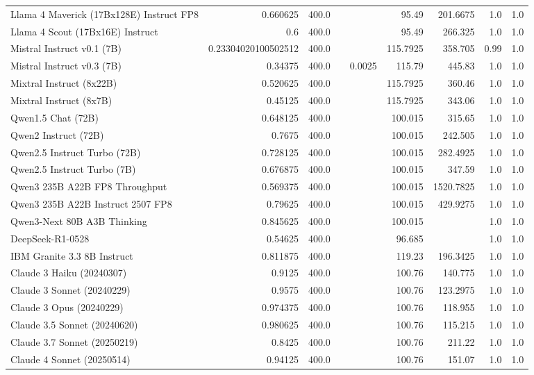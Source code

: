 \begin{table}[htp]
{\begin{tabular}{lrrrrrrrr}
Llama 4 Maverick (17Bx128E) Instruct FP8 & 0.660625 & 400.0 &  &  & 95.49 & 201.6675 & 1.0 & 1.0 \\
Llama 4 Scout (17Bx16E) Instruct & 0.6 & 400.0 &  &  & 95.49 & 266.325 & 1.0 & 1.0 \\
Mistral Instruct v0.1 (7B) & 0.23304020100502512 & 400.0 &  &  & 115.7925 & 358.705 & 0.99 & 1.0 \\
Mistral Instruct v0.3 (7B) & 0.34375 & 400.0 &  & 0.0025 & 115.79 & 445.83 & 1.0 & 1.0 \\
Mixtral Instruct (8x22B) & 0.520625 & 400.0 &  &  & 115.7925 & 360.46 & 1.0 & 1.0 \\
Mixtral Instruct (8x7B) & 0.45125 & 400.0 &  &  & 115.7925 & 343.06 & 1.0 & 1.0 \\
Qwen1.5 Chat (72B) & 0.648125 & 400.0 &  &  & 100.015 & 315.65 & 1.0 & 1.0 \\
Qwen2 Instruct (72B) & 0.7675 & 400.0 &  &  & 100.015 & 242.505 & 1.0 & 1.0 \\
Qwen2.5 Instruct Turbo (72B) & 0.728125 & 400.0 &  &  & 100.015 & 282.4925 & 1.0 & 1.0 \\
Qwen2.5 Instruct Turbo (7B) & 0.676875 & 400.0 &  &  & 100.015 & 347.59 & 1.0 & 1.0 \\
Qwen3 235B A22B FP8 Throughput & 0.569375 & 400.0 &  &  & 100.015 & 1520.7825 & 1.0 & 1.0 \\
Qwen3 235B A22B Instruct 2507 FP8 & 0.79625 & 400.0 &  &  & 100.015 & 429.9275 & 1.0 & 1.0 \\
Qwen3-Next 80B A3B Thinking & 0.845625 & 400.0 &  &  & 100.015 &  & 1.0 & 1.0 \\
DeepSeek-R1-0528 & 0.54625 & 400.0 &  &  & 96.685 &  & 1.0 & 1.0 \\
IBM Granite 3.3 8B Instruct & 0.811875 & 400.0 &  &  & 119.23 & 196.3425 & 1.0 & 1.0 \\
Claude 3 Haiku (20240307) & 0.9125 & 400.0 &  &  & 100.76 & 140.775 & 1.0 & 1.0 \\
Claude 3 Sonnet (20240229) & 0.9575 & 400.0 &  &  & 100.76 & 123.2975 & 1.0 & 1.0 \\
Claude 3 Opus (20240229) & 0.974375 & 400.0 &  &  & 100.76 & 118.955 & 1.0 & 1.0 \\
Claude 3.5 Sonnet (20240620) & 0.980625 & 400.0 &  &  & 100.76 & 115.215 & 1.0 & 1.0 \\
Claude 3.7 Sonnet (20250219) & 0.8425 & 400.0 &  &  & 100.76 & 211.22 & 1.0 & 1.0 \\
Claude 4 Sonnet (20250514) & 0.94125 & 400.0 &  &  & 100.76 & 151.07 & 1.0 & 1.0 \\

\end{tabular}}
\end{table}
